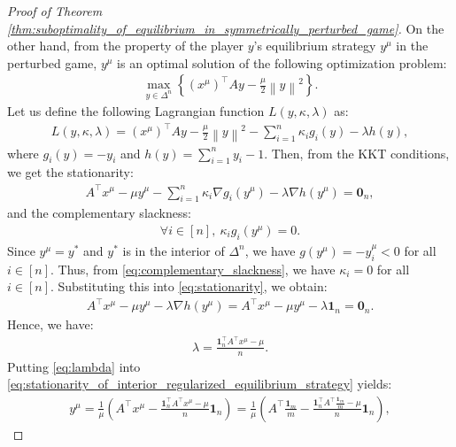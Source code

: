 \documentclass{article}
\newcommand{\bone}{\mathbf{1}}
\newcommand{\bzero}{\mathbf{0}}
\theoremstyle{plain}
\begin{document}
\begin{proof}[Proof of Theorem \ref{thm:suboptimality_of_equilibrium_in_symmetrically_perturbed_game}]
    On the other hand, from the property of the player $y$'s equilibrium strategy $y^{\mu}$ in the perturbed game, $y^{\mu}$ is an optimal solution of the following optimization problem:
    \begin{align*}
        \max_{y\in \Delta^n}\left\{(x^{\mu})^{\top}Ay - \frac{\mu}{2}\left\|y\right\|^2\right\}.
    \end{align*}
    Let us define the following Lagrangian function $L(y, \kappa, \lambda)$ as:
    \begin{align*}
        L(y, \kappa, \lambda) = (x^{\mu})^{\top}Ay - \frac{\mu}{2}\left\|y\right\|^2 - \sum_{i=1}^n \kappa_ig_i(y) - \lambda h(y),
    \end{align*}
    where $g_i(y) = -y_i$ and $h(y) = \sum_{i=1}^ny_i - 1$.
    Then, from the KKT conditions, we get the stationarity:
    \begin{align}
        A^{\top}x^{\mu} - \mu y^{\mu} - \sum_{i=1}^n \kappa_i \nabla g_i(y^{\mu}) - \lambda \nabla h(y^{\mu}) = \bzero_n,
        \label{eq:stationarity}
    \end{align}
    and the complementary slackness:
    \begin{align}
        \forall i\in [n], ~\kappa_i g_i(y^{\mu}) = 0.
        \label{eq:complementary_slackness}
    \end{align}
    Since $y^{\mu} = y^{\ast}$ and $y^{\ast}$ is in the interior of $\Delta^n$, we have $g(y^{\mu}) = -y_i^{\mu} < 0$ for all $i\in [n]$.
    Thus, from \eqref{eq:complementary_slackness}, we have $\kappa_i = 0$ for all $i\in [n]$.
    Substituting this into \eqref{eq:stationarity}, we obtain:
    \begin{align}
        A^{\top}x^{\mu} - \mu y^{\mu} - \lambda \nabla h(y^{\mu}) = A^{\top}x^{\mu} - \mu y^{\mu} - \lambda \bone_n = \bzero_n.
        \label{eq:stationarity_of_interior_regularized_equilibrium_strategy}
    \end{align}
    Hence, we have:
    \begin{align}
        \lambda = \frac{\bone_n^{\top}A^{\top}x^{\mu} - \mu}{n}.
        \label{eq:lambda}
    \end{align}
    Putting \eqref{eq:lambda} into \eqref{eq:stationarity_of_interior_regularized_equilibrium_strategy} yields:
    \begin{align*}
        y^{\mu} = \frac{1}{\mu}\left(A^{\top}x^{\mu} - \frac{\bone_n^{\top}A^{\top}x^{\mu} - \mu}{n}\bone_n\right) = \frac{1}{\mu}\left(A^{\top}\frac{\bone_m}{m} - \frac{\bone_n^{\top}A^{\top}\frac{\bone_m}{m} - \mu}{n}\bone_n\right),

\end{align*}
\end{proof}
\end{document}
